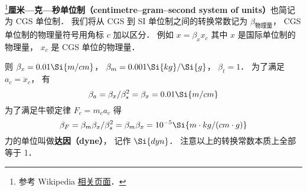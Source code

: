 
\begin{issues}
\issueDraft
{}
\end{issues}


\footnote{参考 Wikipedia \href{https://en.wikipedia.org/wiki/Centimetre-gram-second_system_of_units}{相关页面}．}\textbf{厘米—克—秒单位制（centimetre–gram–second system of units）}也简记为 CGS 单位制． 我们将从 CGS 到 SI 单位制之间的转换常数记为 $\beta_\text{物理量}$， CGS 单位制的物理量符号用角标 $c$ 加以区分． 例如 $x = \beta_x x_c$ 其中 $x$ 是国际单位制的物理量， $x_c$ 是 CGS 单位的物理量．

则 $\beta_x = 0.01\Si{m/cm}$， $\beta_m = 0.001\Si{kg}/\Si{g}$， $\beta_t = 1$． 为了满足 $a_c = \ddot x_c$， 有
\begin{equation}
\beta_a = \beta_x/\beta_s^2 = \beta_x = 0.01 \Si{m/cm}
\end{equation}
为了满足牛顿定律 $F_c = m_ca_c$ 得
\begin{equation}
\beta_F = \beta_m \beta_x/\beta_s^2 = \beta_m\beta_x = 10^{-5} \Si{m\cdot kg/(cm\cdot g)}
\end{equation}
力的单位叫做\textbf{达因（dyne）}， 记作 $\Si{dyn}$． 注意以上的转换常数本质上全部等于 1．
